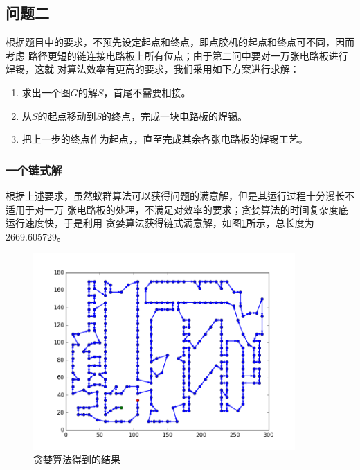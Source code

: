 \documentclass[fontset=windows,a4paper,12pt]{ctexart}
\begin{document}
    \subsection{问题二}
	  根据题目中的要求，不预先设定起点和终点，即点胶机的起点和终点可不同，因而考虑
	  路径更短的链连接电路板上所有位点；由于第二问中要对一万张电路板进行焊锡，这就
	  对算法效率有更高的要求，我们采用如下方案进行求解：
	  \begin{enumerate}
	  	\item 求出一个图$G$的解$S$，首尾不需要相接。
	  	\item 从$S$的起点移动到$S$的终点，完成一块电路板的焊锡。
	  	\item 把上一步的终点作为起点，，直至完成其余各张电路板的焊锡工艺。
	  \end{enumerate}
      \subsubsection{一个链式解}
	      根据上述要求，虽然蚁群算法可以获得问题的满意解，但是其运行过程十分漫长不适用于对一万
	      张电路板的处理，不满足对效率的要求；贪婪算法的时间复杂度底运行速度快，于是利用
	      贪婪算法获得链式满意解，如图\ref{fig:greedy2}所示，总长度为2669.605729。
        \begin{figure}[!htbp]
        	\centering
        	\includegraphics[width=10cm]{pic/greedy_result2.png}
        	\caption{贪婪算法得到的结果}
        	\label{fig:greedy2}
        \end{figure}
\end{document}
